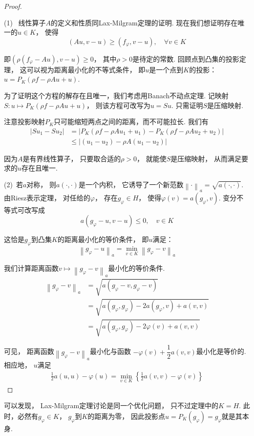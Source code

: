 \begin{proof}
    ~

    (1)~
    线性算子$A$的定义和性质同Lax-Milgram定理的证明.
    现在我们想证明存在唯一的$u \in K$，
    使得
    \[
    (Au , v-u) \ge (f_{\varphi} , v-u) , \quad \forall v \in K
    \]

    即$(\rho(f_{\varphi} - Au) , v - u) \ge 0$，
    其中$\rho > 0$是待定的常数.
    回顾点到凸集的投影定理，
    这可以视为距离最小化的不等式条件，
    即$u$是一个点到$K$的投影：$u = P_K (\rho f - \rho A u + u)$.

    为了证明这个方程的解存在且唯一，我们考虑用Banach不动点定理.
    记映射$S: u \mapsto P_{K} (\rho f - \rho A u + u)$，
    则该方程可改写为$u = S u$.
    只需证明$S$是压缩映射.

    注意投影映射$P_K$只可能缩短两点之间的距离，而不可能拉长.
    我们有
    \begin{align*}
        |S u_1 - S u_2 | &= |P_{K} (\rho f - \rho A u_1 + u_1) - P_{K}(\rho f - \rho A u_2 + u_2)| \\
        &\le |(u_1 - u_2) - \rho A (u_1 - u_2)|
    \end{align*}

    因为$A$是有界线性算子，
    只要取合适的$\rho>0$，
    就能使$S$是压缩映射，
    从而满足要求的$u$存在且唯一.

    \medskip

    (2)~若$a$对称，
    则$a(\cdot , \cdot)$是一个内积，
    它诱导了一个新范数$\left\| \cdot \right\|_a = \sqrt{ a (\cdot , \cdot)}$.
    由Riesz表示定理，
    对任给的$\varphi$，
    存在$g_{\varphi} \in H$，
    使得$\varphi (v) = a(g_{\varphi} , v)$.
    变分不等式可改写成
    \[
    a(g_{\varphi} - u , v -u) \le 0 , \quad v \in K
    \]

    这恰是$g_{\varphi}$到凸集$K$的距离最小化的等价条件，
    即$u$满足：
    \[
    \left\| g_{\varphi} - u \right\|_a 
    = \min_{v \in K} \left\| g_{\varphi} - v  \right\|_a
    \]

    我们计算距离函数$v \mapsto \left\| g_{\varphi} - v  \right\|_a$最小化的等价条件.
    \begin{align*}
        \left\| g_{\varphi} - v  \right\|_a
    &= \sqrt{
        a (g_{\varphi} - v , g_{\varphi} - v )
    } \\
    &= \sqrt{
        a(g_{\varphi} ,g_{\varphi} ) - 2 a(g_{\varphi} , v) + a(v,v)
    } \\
    &= \sqrt{
        a(g_{\varphi} ,g_{\varphi} ) - 2 \varphi (v) + a(v,v)
    }
    \end{align*}

    可见，
    距离函数$\left\| g_{\varphi} - v  \right\|_a$最小化与函数
    $- \varphi (v) + \dfrac{1}{2} a(v,v)$最小化是等价的.
    相应地，
    $u$满足
    \begin{align*}
        \frac{1}{2} a(u,u) - \varphi(u) = \min_{v \in K} \left\{ \frac{1}{2} a(v,v) - \varphi (v) \right\}
    \end{align*}
\end{proof}

可以发现，
Lax-Milgram定理讨论是同一个优化问题，
只不过定理中的$K = H$.
此时，必然有$g_{\varphi} \in K$，
$g_{\varphi}$到$K$的距离为零，
因此投影点$u = P_{K} (g_{\varphi}) = g_{\varphi}$就是其本身.




